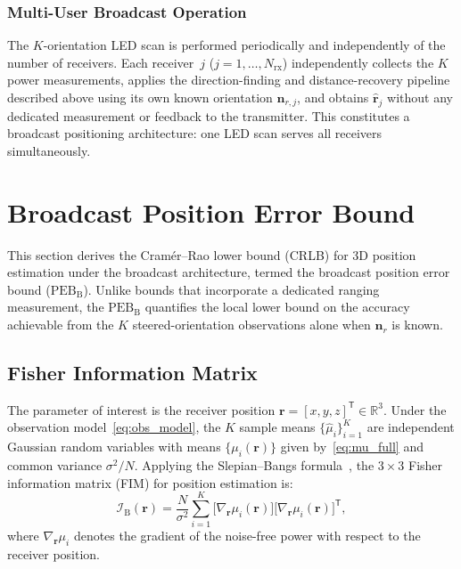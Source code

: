 \documentclass[conference]{IEEEtran}
\begin{document}
\subsubsection{Multi-User Broadcast Operation}
The $K$-orientation LED scan is performed periodically and independently of the number of receivers.
Each receiver~$j$ ($j=1,\ldots,N_{\mathrm{rx}}$) independently collects the $K$ power measurements, applies the direction-finding and distance-recovery pipeline described above using its own known orientation $\mathbf{n}_{r,j}$, and obtains $\hat{\mathbf{r}}_j$ without any dedicated measurement or feedback to the transmitter.
This constitutes a broadcast positioning architecture: one LED scan serves all receivers simultaneously.

\section{Broadcast Position Error Bound}
\label{sec:peb}

This section derives the Cram\'{e}r--Rao lower bound (CRLB) for 3D position estimation under the broadcast architecture, termed the broadcast position error bound ($\mathrm{PEB}_\mathrm{B}$).
Unlike bounds that incorporate a dedicated ranging measurement, the $\mathrm{PEB}_\mathrm{B}$ quantifies the local lower bound on the accuracy achievable from the $K$ steered-orientation observations alone when $\mathbf{n}_r$ is known.

\subsection{Fisher Information Matrix}
\label{subsec:fim}

The parameter of interest is the receiver position $\mathbf{r}=[x,y,z]^{\mathsf T}\in\mathbb{R}^3$.
Under the observation model~\eqref{eq:obs_model}, the $K$ sample means $\{\hat\mu_i\}_{i=1}^K$ are independent Gaussian random variables with means $\{\mu_i(\mathbf{r})\}$ given by~\eqref{eq:mu_full} and common variance $\sigma^2/N$.
Applying the Slepian--Bangs formula~\cite{Kay1993}, the $3\times 3$ Fisher information matrix (FIM) for position estimation is:
\begin{equation}
\mathcal{I}_{\mathrm{B}}(\mathbf{r})
= \frac{N}{\sigma^2}\sum_{i=1}^K
  \bigl[\nabla_{\mathbf{r}}\mu_i(\mathbf{r})\bigr]
  \bigl[\nabla_{\mathbf{r}}\mu_i(\mathbf{r})\bigr]^{\!\mathsf T},
\label{eq:fim_broadcast}
\end{equation}
where $\nabla_{\mathbf{r}}\mu_i$ denotes the gradient of the noise-free power with respect to the receiver position.
\end{document}
